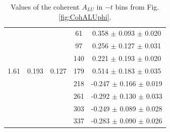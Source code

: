 \documentclass[aps,prc,preprint,superscriptaddress]{revtex4}
\begin{document}
\begin{table}[!h]
\begin{center}
\begin{tabular}{|c|c|c|c|c|}
        &       &       &  61   &  0.358  $\pm$ 0.093  $\pm$ 0.020  \\
        &       &       &  97   &  0.256  $\pm$ 0.127  $\pm$ 0.031  \\
        &       &       & 140   &  0.221  $\pm$ 0.193  $\pm$ 0.020  \\
  1.61  & 0.193 & 0.127 & 179   &  0.514  $\pm$ 0.183  $\pm$ 0.035  \\
        &       &       & 218   & -0.247  $\pm$ 0.166  $\pm$ 0.019  \\
        &       &       & 261   & -0.292  $\pm$ 0.130  $\pm$ 0.033  \\
        &       &       & 303   & -0.249  $\pm$ 0.089  $\pm$ 0.028  \\
        &       &       & 337   & -0.283  $\pm$ 0.090  $\pm$ 0.026  \\
         \hline
      \end{tabular}
      \caption{Values of the coherent $A_{LU}$ in $-t$ bins from Fig. \ref{fig:CohALUphi}.}
      \label{table:Coh_t_BSA}
   \end{center}
\end{table}

\end{document}
